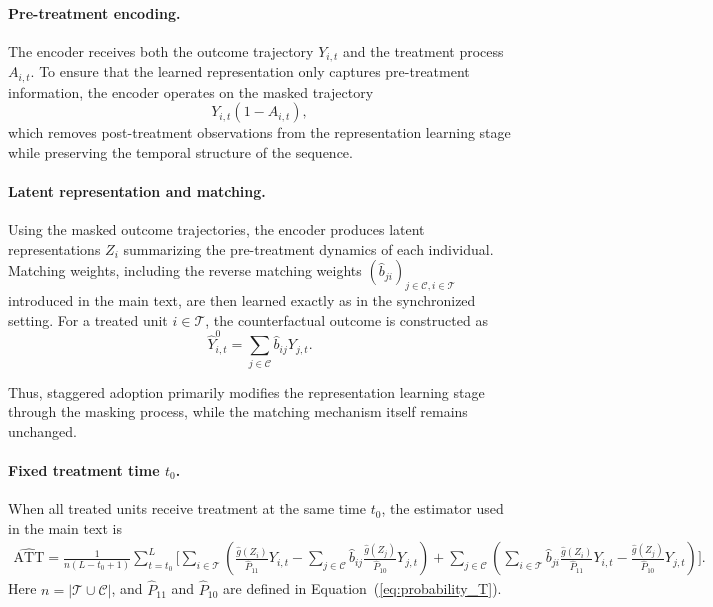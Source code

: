 \documentclass[10pt]{article} %
\begin{document}
{\paragraph{Pre-treatment encoding.}
The encoder receives both the outcome trajectory $Y_{i,t}$ and the treatment process $A_{i,t}$. To ensure that the learned representation only captures pre-treatment information, the encoder operates on the masked trajectory
\[
Y_{i,t}(1-A_{i,t}),
\]
which removes post-treatment observations from the representation learning stage while preserving the temporal structure of the sequence.}


{\paragraph{Latent representation and matching.}
Using the masked outcome trajectories, the encoder produces latent representations $Z_i$ summarizing the pre-treatment dynamics of each individual. Matching weights, including the reverse matching weights
$(\hat b_{ji})_{j \in \mathcal C, i \in \mathcal T}$ introduced in the main text, are then learned exactly as in the synchronized setting. For a treated unit $i \in \mathcal{T}$, the counterfactual outcome is constructed as
\[
\hat Y_{i,t}^0
=
\sum_{j \in \mathcal C}
\hat b_{ij} Y_{j,t}.
\]
}

{Thus, staggered adoption primarily modifies the representation learning stage through the masking process, while the matching mechanism itself remains unchanged.}

{\paragraph{Fixed treatment time $t_0$.}
When all treated units receive treatment at the same time $t_0$, the estimator used in the main text is
\begin{align}
\hat{\mathrm{ATT}} =
\frac{1}{n(L-t_0+1)}
\sum_{t=t_0}^{L}
\Bigg[
\sum_{i \in \mathcal{T}}
\left(
\frac{\hat g(Z_i)}{\hat{ P}_{11}} Y_{i,t}
-
\sum_{j \in \mathcal{C}} \hat b_{ij}\frac{\hat g(Z_j)}{\hat{ P}_{10}} Y_{j,t}
\right)
+
\sum_{j \in \mathcal{C}}
\left(
\sum_{i \in \mathcal{T}} \hat b_{ji}\frac{\hat g(Z_i)}{\hat{ P}_{11}} Y_{i,t}
-
\frac{\hat g(Z_j)}{\hat{ P}_{10}} Y_{j,t}
\right)
\Bigg].
\label{eq:estimator_fixed_appendix}
\end{align}
Here $n = |\mathcal{T} \cup \mathcal{C}|$, and $\hat{ P}_{11}$ and $\hat{P}_{10}$ are defined in Equation~(\ref{eq:probability_T}).}
\end{document}
